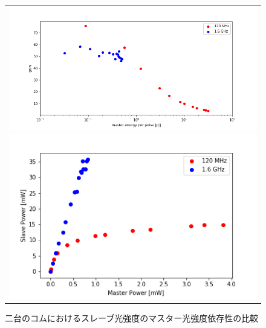 \documentclass[uplatex, dvipdfmx, a4paper, report, papersize, 11pt]{jsbook}
\begin{document}
\begin{figure}[htpb]
  \centering
    \begin{tabular}{c}


      \begin{minipage}{0.50\hsize}
        \centering
          \includegraphics[keepaspectratio,  scale=0.30,  angle=0]
                          {figures/chapter4/pulse_power-gain-comparison.png}
                          \caption{二台のコムにおけるTAの利得のパルスエネルギー依存性の比較}
                          \label{pulse_power-gain-comparison}
      \end{minipage}


      \begin{minipage}{0.50\hsize}
        \centering
          \includegraphics[keepaspectratio,  scale=0.35,  angle=0]
                          {figures/chapter4/M-S_power_comparison.png}
                          \caption{二台のコムにおけるスレーブ光強度のマスター光強度依存性の比較}
                          \label{M-S_power-comparison}
      \end{minipage} \\


\end{tabular}
\end{figure}
\end{document}
